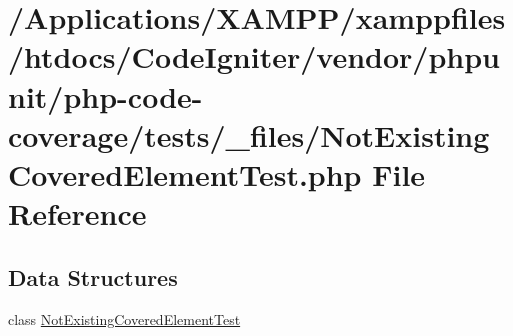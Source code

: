 \hypertarget{php-code-coverage_2tests_2__files_2_not_existing_covered_element_test_8php}{}\section{/\+Applications/\+X\+A\+M\+P\+P/xamppfiles/htdocs/\+Code\+Igniter/vendor/phpunit/php-\/code-\/coverage/tests/\+\_\+files/\+Not\+Existing\+Covered\+Element\+Test.php File Reference}
\label{php-code-coverage_2tests_2__files_2_not_existing_covered_element_test_8php}
\subsection*{Data Structures}
\begin{DoxyCompactItemize}
\item 
class \mbox{\hyperlink{class_not_existing_covered_element_test}{Not\+Existing\+Covered\+Element\+Test}}
\end{DoxyCompactItemize}
